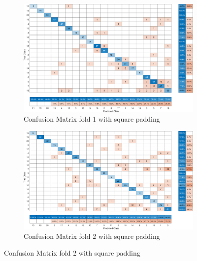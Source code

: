 \documentclass[letterpaper]{article} %
\begin{document}
\begin{figure}
    \begin{subfigure}{0.45\textwidth}
        \includegraphics[width=\textwidth,height=0.25\textheight]{No_Preprocessing_fold1_80_20_square_acc_0.85298.pdf}
        \caption{Confusion Matrix fold 1 with square padding}
    \end{subfigure}
    \begin{subfigure}{0.45\textwidth}
        \includegraphics[width=\textwidth,height=0.25\textheight]{No_Preprocessing_fold2_80_20_square_acc_0.83179.pdf}
        \caption{Confusion Matrix fold 2 with square padding}
    \end{subfigure}


\end{figure}
\end{document}
